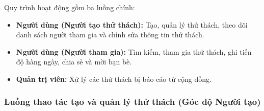 Quy trình hoạt động gồm ba luồng chính:
\begin{itemize}
    \item \textbf{Người dùng (Người tạo thử thách):} Tạo, quản lý thử thách, theo dõi danh sách người tham gia và chỉnh sửa thông tin thử thách.
    \item \textbf{Người dùng (Người tham gia):} Tìm kiếm, tham gia thử thách, ghi tiến độ hàng ngày, chia sẻ và mời bạn bè.
    \item \textbf{Quản trị viên:} Xử lý các thử thách bị báo cáo từ cộng đồng.
\end{itemize}

\subsubsection{Luồng thao tác tạo và quản lý thử thách (Góc độ Người tạo)}
